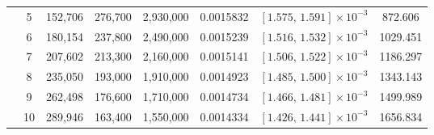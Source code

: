 \begin{longtable}{c|c|c|c|c|c|c|c}
& 5 & 152,706 & 276,700 & 2,930,000
& 0.0015832
& \(\left[1.575,\,1.591\right]\times10^{-3}\)
& 872.606 \\ \cline{2-8}

& 6 & 180,154 & 237,800 & 2,490,000
& 0.0015239
& \(\left[1.516,\,1.532\right]\times10^{-3}\)
& 1029.451 \\ \cline{2-8}

& 7 & 207,602 & 213,300 & 2,160,000
& 0.0015141
& \(\left[1.506,\,1.522\right]\times10^{-3}\)
& 1186.297 \\ \cline{2-8}

& 8 & 235,050 & 193,000 & 1,910,000
& 0.0014923
& \(\left[1.485,\,1.500\right]\times10^{-3}\)
& 1343.143 \\ \cline{2-8}

& 9 & 262,498 & 176,600 & 1,710,000
& 0.0014734
& \(\left[1.466,\,1.481\right]\times10^{-3}\)
& 1499.989 \\ \cline{2-8}

& 10 & 289,946 & 163,400 & 1,550,000
& 0.0014334
& \(\left[1.426,\,1.441\right]\times10^{-3}\)
& 1656.834 \\
\hline

\end{longtable}
